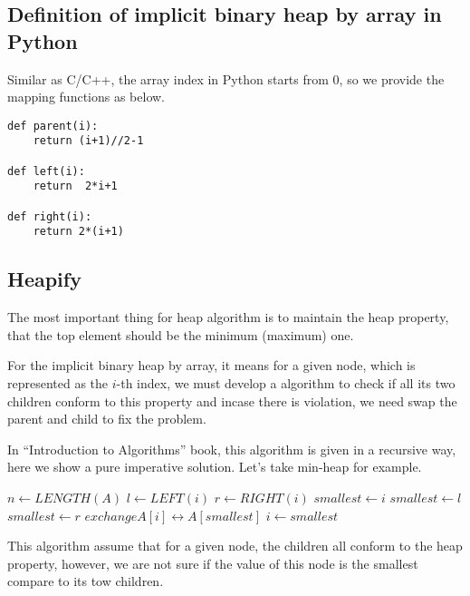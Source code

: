 \documentclass{article}
\begin{document}
\subsection*{Definition of implicit binary heap by array in Python}
Similar as C/C++, the array index in Python starts from 0, so we provide
the mapping functions as below.

\lstset{language=Python}
\begin{lstlisting}
def parent(i):
    return (i+1)//2-1

def left(i):
    return  2*i+1

def right(i):
    return 2*(i+1)
\end{lstlisting}

\subsection{Heapify}

The most important thing for heap algorithm is to maintain the heap
property, that the top element should be the minimum (maximum) one.

For the implicit binary heap by array, it means for a given node,
which is represented as the $i$-th index, we must develop a algorithm
to check if all its two children conform to this property and incase
there is violation, we need swap the parent and child to fix the 
problem. 

In ``Introduction to Algorithms'' book\cite{CLRS}, this algorithm
is given in a recursive way, here we show a pure imperative solution.
Let's take min-heap for example.

\begin{algorithmic}[1]
  \State $n \gets LENGTH(A)$
  \Loop
    \State $l \gets LEFT(i)$
    \State $r \gets RIGHT(i)$
    \State $smallest \gets i$
      \State $smallest \gets l$
    \EndIf
      \State $smallest \gets r$
    \EndIf
      \State $exchange A[i] \leftrightarrow A[smallest]$
      \State $i \gets smallest$
    \Else
      \State \Return
    \EndIf
  \EndLoop
\EndFunction
\end{algorithmic}

This algorithm assume that for a given node, the children all conform 
to the heap property, however, we are not sure if the value of this node 
is the smallest compare to its tow children.
\end{document}
